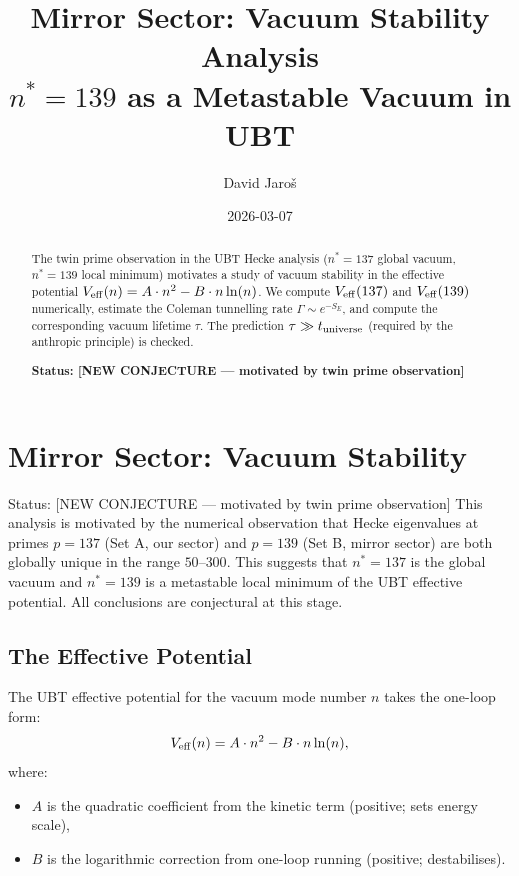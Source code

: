 \documentclass[12pt]{article}
\title{\textbf{Mirror Sector: Vacuum Stability Analysis}\\
         \large $n^* = 139$ as a Metastable Vacuum in UBT}
\author{David Jaroš}
\date{2026-03-07}
\theoremstyle{definition}
\theoremstyle{remark}
\begin{document}
  \maketitle

  \begin{abstract}
  The twin prime observation in the UBT Hecke analysis ($n^*=137$ global vacuum,
  $n^*=139$ local minimum) motivates a study of vacuum stability in the effective
  potential $V_{\rm eff}(n) = A\cdot n^2 - B\cdot n\ln(n)$.
  We compute $V_{\rm eff}(137)$ and $V_{\rm eff}(139)$ numerically, estimate the
  Coleman tunnelling rate $\Gamma \sim e^{-S_E}$, and compute the corresponding
  vacuum lifetime $\tau$.  The prediction $\tau \gg t_{\rm universe}$ (required by
  the anthropic principle) is checked.

  \textbf{Status: [NEW CONJECTURE — motivated by twin prime observation]}
  \end{abstract}
\fi

\section{Mirror Sector: Vacuum Stability}
\label{sec:vacuum_stability}

\begin{statusbox}{Status: [NEW CONJECTURE — motivated by twin prime observation]}
This analysis is motivated by the numerical observation that Hecke eigenvalues at
primes $p=137$ (Set A, our sector) and $p=139$ (Set B, mirror sector) are both
globally unique in the range $50$--$300$.  This suggests that $n^*=137$ is the
global vacuum and $n^*=139$ is a metastable local minimum of the UBT effective
potential.  All conclusions are conjectural at this stage.
\end{statusbox}

\subsection{The Effective Potential}

The UBT effective potential for the vacuum mode number $n$ takes the one-loop form:
\begin{equation}
  V_{\rm eff}(n) = A\cdot n^2 - B\cdot n\ln(n),
  \label{eq:Veff}
\end{equation}
where:
\begin{itemize}
  \item $A$ is the quadratic coefficient from the kinetic term (positive; sets energy scale),
  \item $B$ is the logarithmic correction from one-loop running (positive; destabilises).
\end{itemize}
\end{document}
